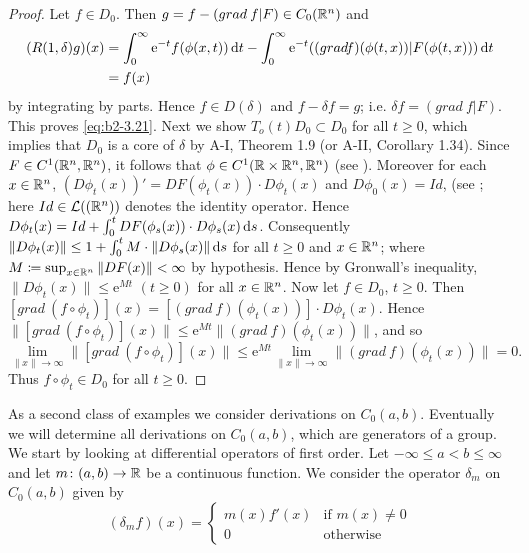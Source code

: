 \begin{proof}
Let $f \in D_{0}$.
Then $g = f - (grad\: f | F) \in C_{0}(\mathbb{R}^{n})$ and
\[
\begin{split}
(R(1,\delta)g)(x) 
&= \int_{0}^{\infty} \mathrm{e}^{-t}f(\phi(x,t)) \mathop{}\!\mathrm{d}{t} - \int_{0}^{\infty} \mathrm{e}^{-t}((gradf)(\phi(t,x)) | F(\phi(t,x))) \mathop{}\!\mathrm{d}{t} \\
&= f(x)
\end{split}
\]
 by integrating by parts.
Hence $f \in D(\delta)$ and $f - \delta f = g$; i.e. $\delta f = (grad\: f|F)$.
This proves \eqref{eq:b2-3.21}.
Next we show $T_{o}(t)D_{0} \subset D_{0}$ for all $t \geq 0$, which implies that $D_{0}$ is a core of $\delta$ by A-I, Theorem 1.9 (or A-II, Corollary 1.34). 
Since $F \in C^{1}(\mathbb{R}^{n},\mathbb{R}^{n})$, it follows that $\phi \in C^{1}(\mathbb{R} \times \mathbb{R}^{n},\mathbb{R}^{n})$ (see \eg \citet[15.2]{hirschsmale:1974}).
Moreover for each $x \in \mathbb{R}^{n}$, $(D\phi_{t}(x))' = DF(\phi_{t}(x)) \cdot D\phi_{t}(x)$ and $D\phi_{0}(x) = Id$, (see \citet[p. 300]{hirschsmale:1974}; here $Id \in \mathcal{L}((\mathbb{R}^{n}))$ denotes the identity operator.
Hence $D\phi_{t}(x) = Id + \int_{0}^{t} DF(\phi_{s}(x)) \cdot D\phi_{s}(x) \mathop{}\!\mathrm{d}{s}$.
Consequently $\|D\phi_{t}(x)\| \leq 1 + \int_{0}^{t}  M \cdot  \|D\phi_{s}(x)\| \mathop{}\!\mathrm{d}{s}$ for all $t \geq 0$ and $x \in \mathbb{R}^{n}$; where $M \coloneqq \sup_{x \in \mathbb{R}^{n}} \|DF(x)\| < \infty$ by hypothesis.
Hence by Gronwall's inequality, $\|D\phi_{t}(x)\| \leq \mathrm{e}^{Mt}$ $(t \geq 0)$ for all $x \in \mathbb{R}^{n}$.
Now let $f \in D_{0}$, $t \geq 0$.
Then $[grad\:(f \circ \phi_{t})](x) = [(grad\:f)(\phi_{t}(x))] \cdot D\phi_{t}(x)$.
Hence $\|[grad\:(f \circ \phi_{t})](x)\| \leq \mathrm{e}^{Mt}\|(grad\:f)(\phi_{t}(x))\|$, and so 
\[
\lim_{\|x\| \to \infty} \|[grad\:(f \circ \phi_{t})](x)\| \leq \mathrm{e}^{Mt} \lim_{\|x\| \to \infty} \|(grad\:f)(\phi_{t}(x))\| = 0.
\]
Thus $f \circ \phi_{t} \in D_{0}$ for all $t \geq 0$.
\end{proof}
As a second class of examples we consider derivations on $C_{0}(a,b)$.
Eventually we will determine all derivations on $C_{0}(a,b)$, which are generators of a group.
We start by looking at differential operators of first order.
Let $-\infty \leq a < b \leq \infty$ and let $m \colon (a,b) \to \mathbb{R}$ be a continuous function.
We consider the operator $\delta_{m}$ on $C_{0}(a,b)$ given by
\begin{equation*}\label{eq:b2-delta-m}
(\delta_{m}f)(x) = \begin{cases}
    m(x)f'(x) & \text{if } m(x) \neq 0 \\
    0 & \text{otherwise}
\end{cases}
\end{equation*}
